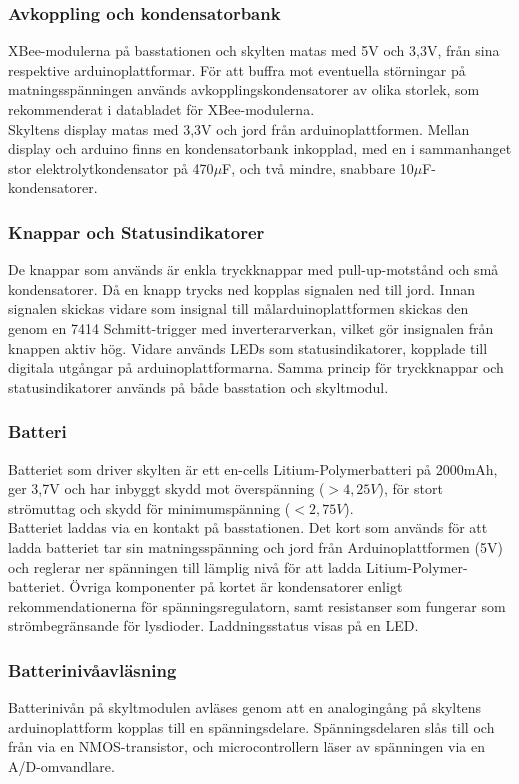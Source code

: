 \documentclass[a4paper,11pt]{article}
\begin{document}
\subsubsection{Avkoppling och kondensatorbank}
XBee-modulerna på basstationen och skylten matas med 5V och 3,3V, från sina respektive arduinoplattformar. För att buffra mot eventuella störningar på matningsspänningen används avkopplingskondensatorer av olika storlek, som rekommenderat i databladet för XBee-modulerna. \\

Skyltens display matas med 3,3V och jord från arduinoplattformen. Mellan display och arduino finns en kondensatorbank inkopplad, med en i sammanhanget stor elektrolytkondensator på 470$\mu$F, och två mindre, snabbare 10$\mu$F-kondensatorer. 

\subsubsection{Knappar och Statusindikatorer}
De knappar som används är enkla tryckknappar med pull-up-motstånd och små kondensatorer. Då en knapp trycks ned kopplas signalen ned till jord. Innan signalen skickas vidare som insignal till målarduinoplattformen skickas den genom en 7414 Schmitt-trigger med inverterarverkan, vilket gör insignalen från knappen aktiv hög. Vidare används LEDs som statusindikatorer, kopplade till digitala utgångar på arduinoplattformarna. Samma princip för tryckknappar och statusindikatorer används på både basstation och skyltmodul.

\subsubsection{Batteri}
Batteriet som driver skylten är ett en-cells Litium-Polymerbatteri på 2000mAh, ger 3,7V och har inbyggt skydd mot överspänning ($>4,25V$), för stort strömuttag och skydd för minimumspänning ($<2,75V$). \\

Batteriet laddas via en kontakt på basstationen. Det kort som används för att ladda batteriet tar sin matningsspänning och jord från Arduinoplattformen (5V) och reglerar ner spänningen till lämplig nivå för att ladda Litium-Polymer-batteriet. Övriga komponenter på kortet är kondensatorer enligt rekommendationerna för spänningsregulatorn, samt resistanser som fungerar som strömbegränsande för lysdioder. Laddningsstatus visas på en LED.

\subsubsection{Batterinivåavläsning}
Batterinivån på skyltmodulen avläses genom att en analogingång på skyltens arduinoplattform kopplas till en spänningsdelare. Spänningsdelaren slås till och från via en NMOS-transistor, och microcontrollern läser av spänningen via en A/D-omvandlare.
\end{document}
